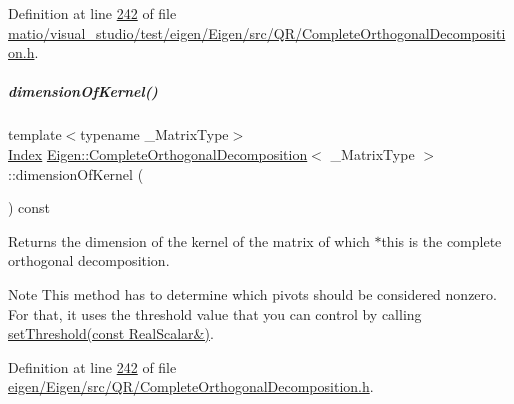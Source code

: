 Definition at line \hyperlink{matio_2visual__studio_2test_2eigen_2_eigen_2src_2_q_r_2_complete_orthogonal_decomposition_8h_source_l00242}{242} of file \hyperlink{matio_2visual__studio_2test_2eigen_2_eigen_2src_2_q_r_2_complete_orthogonal_decomposition_8h_source}{matio/visual\+\_\+studio/test/eigen/\+Eigen/src/\+Q\+R/\+Complete\+Orthogonal\+Decomposition.\+h}.

\mbox{\label{group___q_r___module_aca2b59560c4851b7d7701872990a3426}} 
\subparagraph{\texorpdfstring{dimension\+Of\+Kernel()}{dimensionOfKernel()}\hspace{0.1cm}{\footnotesize\ttfamily [2/2]}}
{\footnotesize\ttfamily template$<$typename \+\_\+\+Matrix\+Type$>$ \\
\hyperlink{namespace_eigen_a62e77e0933482dafde8fe197d9a2cfde}{Index} \hyperlink{group___q_r___module_class_eigen_1_1_complete_orthogonal_decomposition}{Eigen\+::\+Complete\+Orthogonal\+Decomposition}$<$ \+\_\+\+Matrix\+Type $>$\+::dimension\+Of\+Kernel (\begin{DoxyParamCaption}{ }\end{DoxyParamCaption}) const\hspace{0.3cm}{\ttfamily [inline]}}

\begin{DoxyReturn}{Returns}
the dimension of the kernel of the matrix of which $\ast$this is the complete orthogonal decomposition.
\end{DoxyReturn}
\begin{DoxyNote}{Note}
This method has to determine which pivots should be considered nonzero. For that, it uses the threshold value that you can control by calling \hyperlink{group___q_r___module_aa9c9f7cbde9d58ca5552381b70ad8d82}{set\+Threshold(const Real\+Scalar\&)}. 
\end{DoxyNote}


Definition at line \hyperlink{eigen_2_eigen_2src_2_q_r_2_complete_orthogonal_decomposition_8h_source_l00242}{242} of file \hyperlink{eigen_2_eigen_2src_2_q_r_2_complete_orthogonal_decomposition_8h_source}{eigen/\+Eigen/src/\+Q\+R/\+Complete\+Orthogonal\+Decomposition.\+h}.

